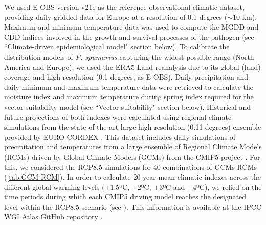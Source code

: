 We used E-OBS version v21e \cite{cornes_ensemble_2018} as the reference
observational climatic dataset, providing daily gridded data for Europe at a
resolution of 0.1 degrees ($\sim$10 km). Maximum and minimum temperature data
was used to compute the MGDD and CDD indices involved in the growth and
survival processes of the \xf{} pathogen (see ``Climate-driven epidemiological
model" section below). To calibrate the distribution models of \textit{P.
    spumarius} capturing the widest possible range (North America and Europe),
we
used the ERA5-Land reanalysis
\cite{munoz-sabater_era5-land_2021} due to its global (land) coverage and
high resolution (0.1 degrees, as E-OBS). Daily precipitation and daily minimum
and maximum temperature data were retrieved to calculate the moisture index and
maximum temperature during spring index required for the vector suitability
model (see ``Vector suitability" section below).
Historical and future projections of both indexes were calculated using
regional climate simulations from the state-of-the-art large high-resolution
(0.11 degrees) ensemble provided by EURO-CORDEX \cite{giorgi_regional_2015}.
This dataset includes daily simulations of precipitation and temperatures from
a large ensemble of Regional Climate Models (RCMs) driven by Global Climate
Models (GCMs) from the CMIP5 project \cite{Taylor_2011}. For this, we
considered the RCP8.5 simulations for 40 combinations of GCMs-RCMs
(\cref{tab:GCM-RCM}). In order to calculate 20-year mean climatic indexes
across the different global warming levels (+1.5ºC, +2ºC, +3ºC and +4ºC), we
relied on the time periods during which each CMIP5 driving model reaches the
designated level within the RCP8.5 scenario (see
\cite{diez-sierra_consistency_2023}). This information is available at the IPCC
WGI Atlas GitHub repository \cite{iturbide_repository_2021}.

